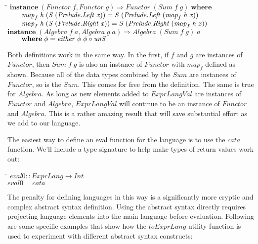 \documentclass[11pt]{article}
\newlength{\lwidth}\setlength{\lwidth}{4.5cm}
\newlength{\cwidth}\setlength{\cwidth}{8mm} %
\newcommand{\Conid}[1]{\mathit{#1}}
\newcommand{\Varid}[1]{\mathit{#1}}
\begin{document}
\begin{tabbing}
\qquad\=\hspace{\lwidth}\=\hspace{\cwidth}\=\+\kill
${\mathbf{instance}\;(\Conid{Functor}\;\Varid{f},\Conid{Functor}\;\Varid{g})\Rightarrow \Conid{Functor}\;(\Conid{Sum}\;\Varid{f}\;\Varid{g})\;\mathbf{where}}$\\
${\hskip2.00em\relax\Varid{map}_{f}\;\Varid{h}\;(\Conid{S}\;(\Conid{\Conid{Prelude}.Left}\;\Varid{x}))\mathrel{=}\Conid{S}\;(\Conid{\Conid{Prelude}.Left}\;(\Varid{map}_{f}\;\Varid{h}\;\Varid{x}))}$\\
${\hskip2.00em\relax\Varid{map}_{f}\;\Varid{h}\;(\Conid{S}\;(\Conid{\Conid{Prelude}.Right}\;\Varid{x}))\mathrel{=}\Conid{S}\;(\Conid{\Conid{Prelude}.Right}\;(\Varid{map}_{f}\;\Varid{h}\;\Varid{x}))}$\\
${}$\\
${\mathbf{instance}\;(\Conid{Algebra}\;\Varid{f}\;\Varid{a},\Conid{Algebra}\;\Varid{g}\;\Varid{a})\Rightarrow \Conid{Algebra}\;(\Conid{Sum}\;\Varid{f}\;\Varid{g})\;\Varid{a}}$\\
${\hskip2.00em\relax\mathbf{where}\;\Varid{\phi}\mathrel{=}\Varid{either}\;\Varid{\phi}\;\Varid{\phi}\mathbin{\circ}\Varid{unS}}$
\end{tabbing}
Both definitions work in the same way.  In the first, if \ensuremath{\Varid{f}} and \ensuremath{\Varid{g}}
are instances of \ensuremath{\Conid{Functor}}, then \ensuremath{\Conid{Sum}\;\Varid{f}\;\Varid{g}} is also an instance of
\ensuremath{\Conid{Functor}} with \ensuremath{\Varid{map}_{f}} defined as shown.  Because all of the data types
combined by the \ensuremath{\Conid{Sum}} are instances of \ensuremath{\Conid{Functor}}, so is the \ensuremath{\Conid{Sum}}.
This comes for free from the definition.  The same is true for
\ensuremath{\Conid{Algebra}}.  As long as new elements added to \ensuremath{\Conid{ExprLangVal}} are
instances of \ensuremath{\Conid{Functor}} and \ensuremath{\Conid{Algebra}}, \ensuremath{\Conid{ExprLangVal}} will continue to
be an instance of \ensuremath{\Conid{Functor}} and \ensuremath{\Conid{Algebra}}.  This is a rather amazing
result that will save substantial effort as we add to our language.

The easiest way to define an eval function for the language is to use
the \ensuremath{\Varid{cata}} function.  We'll include a type signature to help make
types of return values work out:

\begin{tabbing}
\qquad\=\hspace{\lwidth}\=\hspace{\cwidth}\=\+\kill
${\Varid{eval0}\mathbin{::}\Conid{ExprLang}\to \Conid{Int}}$\\
${\Varid{eval0}\mathrel{=}\Varid{cata}}$
\end{tabbing}
The penalty for defining languages in this way is a significantly more
cryptic and complex abstract syntax definition.  Using the abstract
syntax directly requires projecting language elements into the main
language before evaluation.  Following are some specific examples that
show how the \ensuremath{\Varid{toExprLang}} utility function is used to experiment with
different abstract syntax constructs:
\end{document}
